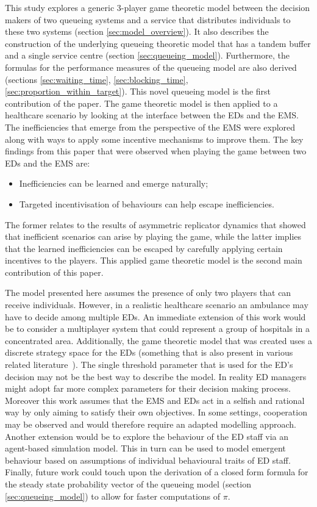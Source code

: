 This study explores a generic 3-player game theoretic model between the
decision makers of two queueing systems and a service that distributes
individuals to these two systems (section \ref{sec:model_overview}).
It also describes the construction of the underlying queueing theoretic model
that has a tandem buffer and a single service centre (section
\ref{sec:queueing_model}).
Furthermore, the formulas for the performance measures of the queueing model
are also derived (sections \ref{sec:waiting_time}, \ref{sec:blocking_time},
\ref{sec:proportion_within_target}).
This novel queueing model is the first contribution of the paper.
The game theoretic model is then applied to a healthcare scenario by looking at
the interface between the EDs and the EMS.
The inefficiencies that emerge from the perspective of the EMS were explored
along with ways to apply some incentive mechanisms to improve them.
The key findings from this paper that were observed when playing the game
between two EDs and the EMS are:
\begin{itemize}
    \item Inefficiencies can be learned and emerge naturally;
    \item Targeted incentivisation of behaviours can help escape inefficiencies.
\end{itemize}
The former relates to the results of asymmetric replicator dynamics that showed
that inefficient scenarios can arise by playing the game, while the latter
implies that the learned inefficiencies can be escaped by carefully applying
certain incentives to the players.
This applied game theoretic model is the second main contribution of this paper.

The model presented here assumes the presence of only two players that can
receive individuals.
However, in a realistic healthcare scenario an ambulance may have to decide
among multiple EDs.
An immediate extension of this work would be to consider a multiplayer system
that could represent a group of hospitals in a concentrated area.
Additionally, the game theoretic model that was created uses a discrete
strategy space for the EDs (something that is also present in various related
literature~\cite{deo2011centralized, knight2017measuring}).
The single threshold parameter that is used for the ED's decision may not be
the best way to describe the model.
In reality ED managers might adopt far more complex parameters for their
decision making process.
Moreover this work assumes that the EMS and EDs act in a selfish and rational
way by only aiming to satisfy their own objectives.
In some settings, cooperation may be observed and would therefore require an
adapted modelling approach.
Another extension would be to explore the behaviour of the ED staff via an
agent-based simulation model.
This in turn can be used to model emergent behaviour based on assumptions of
individual behavioural traits of ED staff.
Finally, future work could touch upon the derivation of a closed form formula for
the steady state probability vector of the queueing model
(section \ref{sec:queueing_model}) to allow for faster computations of \(\pi\).